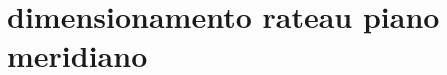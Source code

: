 \documentclass[a4paper, 15pt]{article}
\begin{document}
\section{dimensionamento rateau piano meridiano}
\newpage
\end{document}
